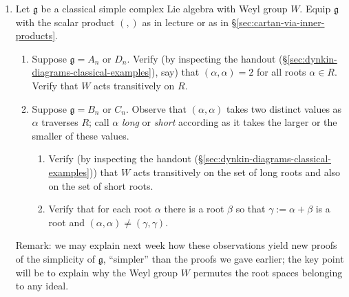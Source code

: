 \documentclass[reqno]{amsart} 
\begin{document}
\begin{homework}
\begin{enumerate}
  \item Let $\mathfrak{g}$ be a classical simple complex Lie
    algebra with Weyl group $W$.  Equip $\mathfrak{g}$ with the scalar product $(,)$
    as in lecture or as in
    \S\ref{sec:cartan-via-inner-products}.
    \begin{enumerate}
    \item
      Suppose
      $\mathfrak{g} = A_n$ or $D_n$.
      Verify (by inspecting the handout (\S\ref{sec:dynkin-diagrams-classical-examples}), say) that $(\alpha,\alpha) = 2$
      for all roots $\alpha \in R$.
      Verify that $W$ acts transitively on $R$.
    \item Suppose $\mathfrak{g} = B_n$ or $C_n$.  Observe that
      $(\alpha,\alpha)$ takes two distinct values as $\alpha$
      traverses $R$; call $\alpha$ \emph{long} or \emph{short}
      according as it takes the larger or the smaller of these
      values.
      \begin{enumerate}
      \item  Verify (by inspecting the handout (\S\ref{sec:dynkin-diagrams-classical-examples})) that $W$ acts transitively
        on the set of long roots and also on the set of short
        roots.
      \item Verify that for each root $\alpha$
        there is a root $\beta$ so that $\gamma := \alpha + \beta$ is a
        root
        and $(\alpha,\alpha) \neq (\gamma,\gamma)$.
      \end{enumerate}
    \end{enumerate}
    Remark: we may explain next week how these observations
    yield new proofs of the simplicity of $\mathfrak{g}$,
    ``simpler'' than the proofs we gave earlier; the key point
    will be to explain why the Weyl group $W$ permutes the root
    spaces belonging to any ideal.


\end{enumerate}
\end{homework}
\end{document}
